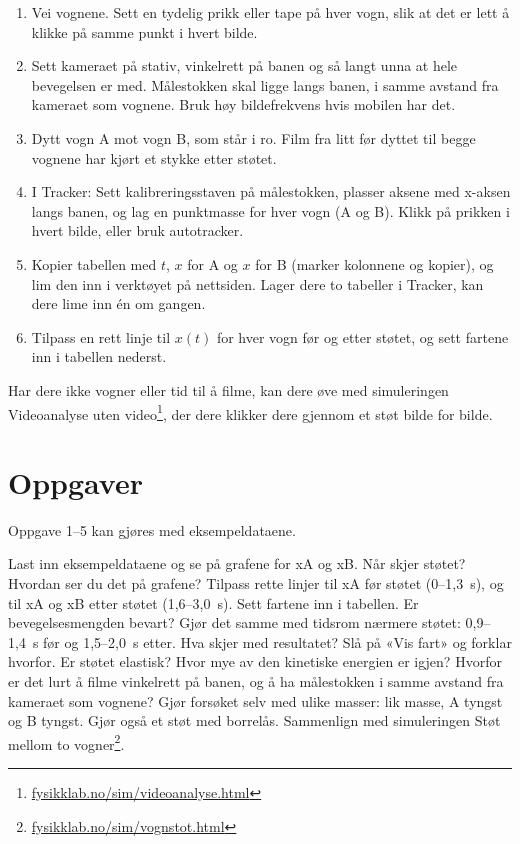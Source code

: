 \documentclass[11pt]{article}
\begin{document}
\begin{enumerate}
\item Vei vognene. Sett en tydelig prikk eller tape på hver vogn, slik at det er lett å klikke på samme punkt i hvert bilde.
\item Sett kameraet på stativ, vinkelrett på banen og så langt unna at hele bevegelsen er med. Målestokken skal ligge langs banen, i samme avstand fra kameraet som vognene. Bruk høy bildefrekvens hvis mobilen har det.
\item Dytt vogn A mot vogn B, som står i ro. Film fra litt før dyttet til begge vognene har kjørt et stykke etter støtet.
\item I Tracker: Sett kalibreringsstaven på målestokken, plasser aksene med x-aksen langs banen, og lag en punktmasse for hver vogn (A og B). Klikk på prikken i hvert bilde, eller bruk autotracker.
\item Kopier tabellen med $t$, $x$ for A og $x$ for B (marker kolonnene og kopier), og lim den inn i verktøyet på nettsiden. Lager dere to tabeller i Tracker, kan dere lime inn én om gangen.
\item Tilpass en rett linje til $x(t)$ for hver vogn før og etter støtet, og sett fartene inn i tabellen nederst.
\end{enumerate}

Har dere ikke vogner eller tid til å filme, kan dere øve med simuleringen Videoanalyse uten video\footnote{\url{fysikklab.no/sim/videoanalyse.html}}, der dere klikker dere gjennom et støt bilde for bilde.

\section*{Oppgaver}

Oppgave 1–5 kan gjøres med eksempeldataene.

\begin{oppgaveliste}
\oppgave {}Last inn eksempeldataene og se på grafene for xA og xB. Når skjer støtet? Hvordan ser du det på grafene?
\svar
\oppgave {}Tilpass rette linjer til xA før støtet (0–1,3~s), og til xA og xB etter støtet (1,6–3,0~s). Sett fartene inn i tabellen. Er bevegelsesmengden bevart?
\svar
\oppgave {}Gjør det samme med tidsrom nærmere støtet: 0,9–1,4~s før og 1,5–2,0~s etter. Hva skjer med resultatet? Slå på «Vis fart» og forklar hvorfor.
\svar
\oppgave {}Er støtet elastisk? Hvor mye av den kinetiske energien er igjen?
\svar
\oppgave {}Hvorfor er det lurt å filme vinkelrett på banen, og å ha målestokken i samme avstand fra kameraet som vognene?
\svar
\oppgave {}Gjør forsøket selv med ulike masser: lik masse, A tyngst og B tyngst. Gjør også et støt med borrelås. Sammenlign med simuleringen Støt mellom to vogner\footnote{\url{fysikklab.no/sim/vognstot.html}}.
\svar
\end{oppgaveliste}
\end{document}
